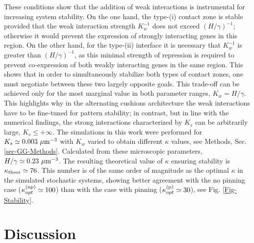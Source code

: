 \documentclass[a4paper,10pt]{article}
\newcommand{\TODO}[1]{\textcolor{blue}{\textbf{($\bigstar$ #1)}}}
\begin{document}
These conditions show that the addition of weak interactions is instrumental for increasing system stability. On the one hand, the type-(i) contact zone is stable provided that the weak interaction strength $K_w^{-1}$ does not exceed $\left(H/\gamma\right)^{-1}$; otherwise it would prevent the expression of strongly interacting genes in this region. On the other hand, for the type-(ii) interface it is necessary that $K_w^{-1}$ is greater than $ \left(H/\gamma\right)^{-1}$, as this minimal strength of repression is required to prevent co-expression of both weakly interacting genes in the same region. This shows that in order to simultaneously stabilize both types of contact zones, one must negotiate between these two largely opposite goals. This trade-off can be achieved only for the most marginal value in both parameter ranges, $K_w=H/\gamma$. This highlights why in the alternating cushions architecture the weak interactions have to be fine-tuned for pattern stability; in contrast, but in line with the numerical findings, the strong interactions characterized by $K_s$ can be arbitrarily large, $K_s\le+\infty$. The simulations in this work were performed for $K_s\simeq0.003~{\rm \mu m^{-3}}$ with $K_w$ varied to obtain different $\kappa$ values, see Methods, Sec. \ref{sec-GG-Methods}. Calculated from these microscopic parameters, $H/\gamma\simeq0.23~{\rm \mu m^{-3}}$. The resulting theoretical value of $\kappa$ ensuring stability is $\kappa_{\rm theor} \simeq 76$. This number is of the same order of magnitude as the optimal $\kappa$ in the simulated stochastic systems, showing better agreement with the no pinning case ($\kappa_{opt}^{\rm (np)}\simeq 100$) than with the case with pinning ($\kappa_{opt}^{\rm (p)}\simeq 30$), see Fig. \ref{Fig-Stability}. %


\clearpage
\section{Discussion}
\end{document}
